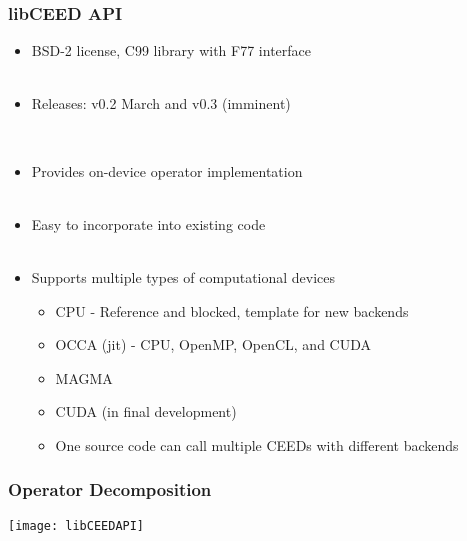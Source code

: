 \documentclass{beamer}
\begin{document}
\begin{frame}
\begin{center}
\frametitle{libCEED API}

\begin{itemize}

\item BSD-2 license, C99 library with F77 interface\\

~\\

\item Releases: v0.2 March and v0.3 (imminent)

~\\

\item Provides on-device operator implementation\\

~\\

\item Easy to incorporate into existing code\\

~\\

\item Supports multiple types of computational devices\\

\begin{itemize}

\item CPU - Reference and blocked, template for new backends

\item OCCA (jit) - CPU, OpenMP, OpenCL, and CUDA

\item MAGMA

\item CUDA (in final development)

\item One source code can call multiple CEEDs with different backends

\end{itemize}

\end{itemize}

\end{center}
\end{frame}


\begin{frame}
\begin{center}
\frametitle{Operator Decomposition}

\texttt{[image: libCEEDAPI]}

\end{center}
\end{frame}
\end{document}

